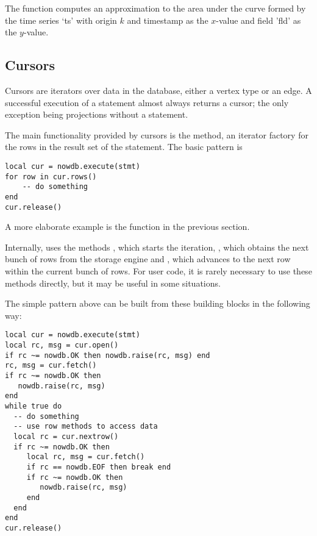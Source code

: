 The function computes an approximation
to the area under the curve
formed by the time series `ts' with origin $k$
and timestamp as the $x$-value and field 'fld'
as the $y$-value.

\subsection{Cursors}
Cursors are iterators over data in the database,
either a vertex type or an edge.
A successful execution of a 
statement almost always returns a cursor;
the only exception being projections without
a  statement.

The main functionality provided by cursors
is the  method, an iterator factory
for the rows in the
result set of the statement.
The basic pattern is

\begin{lua}
\begin{lstlisting}
local cur = nowdb.execute(stmt)
for row in cur.rows()
    -- do something
end
cur.release()
\end{lstlisting}
\end{lua}

A more elaborate example is the 
function in the previous section.

Internally,  uses the methods
, which starts the iteration,
, which obtains the next bunch
of rows from the storage engine and
, which advances to
the next row within the current bunch of rows.
For user code, it is rarely necessary to use
these methods directly, but it may be useful
in some situations.

The simple pattern above can be built from
these building blocks in the following way:

\begin{lua}
\begin{lstlisting}
local cur = nowdb.execute(stmt)
local rc, msg = cur.open()
if rc ~= nowdb.OK then nowdb.raise(rc, msg) end
rc, msg = cur.fetch()
if rc ~= nowdb.OK then
   nowdb.raise(rc, msg)
end
while true do
  -- do something
  -- use row methods to access data
  local rc = cur.nextrow()
  if rc ~= nowdb.OK then
     local rc, msg = cur.fetch()
     if rc == nowdb.EOF then break end
     if rc ~= nowdb.OK then
        nowdb.raise(rc, msg)
     end
  end
end
cur.release()
\end{lstlisting}
\end{lua}

